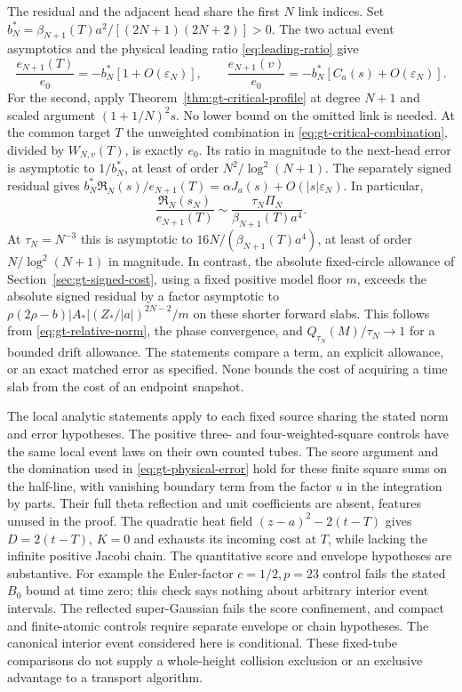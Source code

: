 The residual and the adjacent head share the first \(N\) link
indices. Set \(b_N^*=\beta_{N+1}(T)a^2/[(2N+1)(2N+2)]>0\).
The two actual event asymptotics and the physical leading ratio
\eqref{eq:leading-ratio} give
\[
 \frac{e_{N+1}(T)}{e_0}=-b_N^*[1+O(\varepsilon_N)],\qquad
 \frac{e_{N+1}(v)}{e_0}=-b_N^*[C_a(s)+O(\varepsilon_N)].
\]
For the second, apply Theorem~\ref{thm:gt-critical-profile} at
degree \(N+1\) and scaled argument \((1+1/N)^2s\).
No lower bound on the omitted link is needed. At the common
target \(T\) the unweighted combination in
\eqref{eq:gt-critical-combination}, divided by \(W_{N,v}(T)\),
is exactly \(e_0\). Its ratio in magnitude to the next-head error
is asymptotic to \(1/b_N^*\), at least of order
\(N^2/\log^2(N+1)\). The separately signed residual gives
\(b_N^*\mathfrak R_N(s)/e_{N+1}(T)
=\alpha J_a(s)+O(|s|\varepsilon_N)\). In particular,
\[
 \frac{\mathfrak R_N(s_N)}{e_{N+1}(T)}
     \sim\frac{\tau_N\Pi_N}{\beta_{N+1}(T)a^4}.
\]
At \(\tau_N=N^{-3}\) this is asymptotic to
\(16N/(\beta_{N+1}(T)a^4)\), at least of order
\(N/\log^2(N+1)\) in magnitude. In contrast, the absolute
fixed-circle allowance of Section~\ref{sec:gt-signed-cost},
using a fixed positive model floor \(m\), exceeds the
absolute signed residual by a factor asymptotic to
\(\rho(2\rho-b)|A_*|(Z_*/|a|)^{2N-2}/m\) on these shorter
forward slabs. This follows from \eqref{eq:gt-relative-norm},
the phase convergence, and
\(Q_{\tau_N}(M)/\tau_N\to1\) for a bounded drift allowance.
The statements compare a term, an explicit allowance, or an
exact matched error as specified. None bounds the cost of
acquiring a time slab from the cost of an endpoint snapshot.

The local analytic statements apply to each fixed source sharing
the stated norm and error hypotheses. The positive three- and
four-weighted-square controls have the same local event laws on
their own counted tubes. The score argument and the domination
used in \eqref{eq:gt-physical-error} hold for these finite square
sums on the half-line, with vanishing boundary term from the
factor \(u\) in the integration by parts. Their full theta
reflection and unit coefficients are absent, features unused
in the proof. The quadratic heat field
\((z-a)^2-2(t-T)\) gives \(D=2(t-T)\), \(K=0\) and exhausts
its incoming cost at \(T\), while lacking the infinite positive
Jacobi chain. The quantitative score and envelope hypotheses are
substantive. For example the Euler-factor \(c=1/2,p=23\)
control fails the stated \(B_0\) bound at time zero; this check
says nothing about arbitrary interior event intervals. The
reflected super-Gaussian fails the score confinement, and compact
and finite-atomic controls require separate envelope or chain
hypotheses. The canonical interior event considered here is
conditional. These fixed-tube comparisons do not supply a
whole-height collision exclusion or an exclusive advantage to
a transport algorithm.
